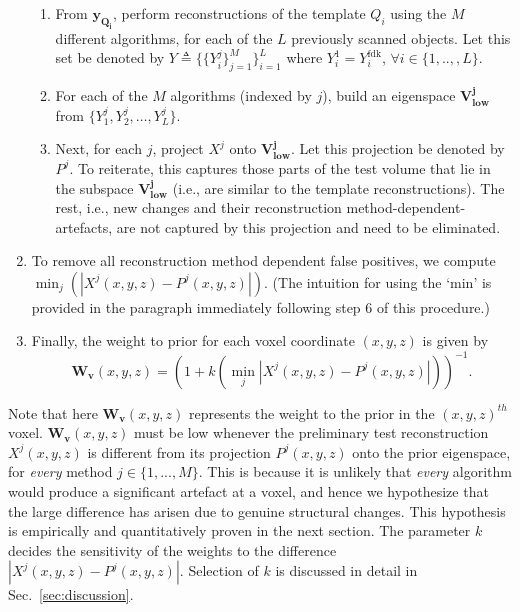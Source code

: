 \documentclass[journal]{IEEEtran}
\begin{document}
\begin{enumerate}
\begin{enumerate}
  \item From $\boldsymbol{y_{Q_i}}$, perform reconstructions of the
    template $Q_i$ using the $M$ different algorithms, for each of the
    $L$ previously scanned objects. Let this set be denoted by $Y
    \triangleq \{\{Y_{i}^j\}_{j=1}^M\}_{i=1}^L$ where $Y^{1}_i =
    Y^{\text{fdk}}_i$, $\forall i \in \{1,..,,L\}$.


  \item For each of the $M$ algorithms (indexed by $j$), build an
    eigenspace $\boldsymbol{V_\text{low}^j}$ from $\{Y_1^j,Y_2^j,
    \ldots, Y_{L}^j\}$. %

  \item Next, for each $j$, project $X^j$ onto
    $\boldsymbol{V_\text{low}^j}$. Let this projection be denoted by
    $P^j$. To reiterate, this captures those parts of the test volume
    that lie in the subspace $\boldsymbol{V_\text{low}^j}$ (i.e., are
    similar to the template reconstructions). The rest, i.e., new
    changes and their reconstruction method-dependent-artefacts, are
    not captured by this projection and need to be eliminated.
  \end{enumerate}
\item To remove all reconstruction method dependent false positives,
  we compute $\min_{j}(|X^j(x,y,z) - P^j(x,y,z)|)$. (The intuition for
  using the `min' is provided in the paragraph immediately following
  step 6 of this procedure.)
\item Finally, the weight to prior for each voxel coordinate $(x,y,z)$
  is given by
  \begin{equation} 
    \boldsymbol{W_v}(x,y,z) = (1+k(\min_{j}|X^j(x,y,z) - P^j(x,y,z)|))^{-1}.
    \label{eq:weightsEq}
  \end{equation}
\end{enumerate}
\vspace{0.01mm} Note that here $\boldsymbol{W_v}(x,y,z)$ represents
the weight to the prior in the $(x,y,z)^{th}$
voxel. $\boldsymbol{W_v}(x,y,z)$ must be low whenever the preliminary
test reconstruction $X^j(x,y,z)$ is different from its projection
$P^j(x,y,z)$ onto the prior eigenspace, for \emph{every} method $j \in
\{1,...,M\}$. This is because it is unlikely that \emph{every}
algorithm would produce a significant artefact at a voxel, and hence
we hypothesize that the large difference has arisen due to genuine
structural changes. This hypothesis is empirically and quantitatively
proven in the next section.  The parameter $k$ decides the sensitivity
of the weights to the difference $|X^j(x,y,z) - P^j(x,y,z)|$.
Selection of $k$ is discussed in detail in Sec.~\ref{sec:discussion}.\\
\end{document}
